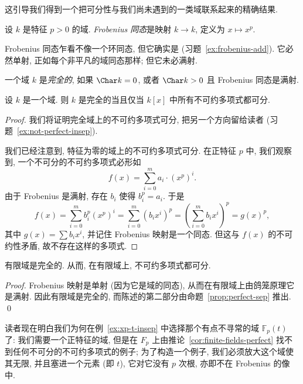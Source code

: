 这引导我们得到一个把可分性与我们尚未遇到的一类域联系起来的精确结果.

\begin{definition}\label{def:frobenius}
设 $k$ 是特征 $p>0$ 的域. \emph{Frobenius 同态}是映射 $k\to k$, 定义为 $x\mapsto x^p$.
\end{definition}

Frobenius 同态乍看不像一个环同态, 但它确实是 (习题~\ref{ex:frobenius-add}). 它必然单射, 正如每个非平凡的域同态那样; 但它未必满射.

\begin{definition}\label{def:perfect}
一个域 $k$ 是\emph{完全的}, 如果 $\Char k=0$, 或者 $\Char k>0$ 且 Frobenius 同态是满射.
\end{definition}

\begin{proposition}\label{prop:perfect-sep}
设 $k$ 是一个域. 则 $k$ 是完全的当且仅当 $k[x]$ 中所有不可约多项式都可分.
\end{proposition}

\begin{proof}
我们将证明完全域上的不可约多项式可分, 把另一个方向留给读者 (习题~\ref{ex:not-perfect-insep}).

我们已经注意到, 特征为零的域上的不可约多项式可分. 在正特征 $p$ 中, 我们观察到, 一个不可分的不可约多项式必形如
\[
f(x)=\sum_{i=0}^{m}a_i\cdot(x^p)^i.
\]
由于 Frobenius 是满射, 存在 $b_i$ 使得 $b_i^p=a_i$. 于是
\[
f(x)=\sum_{i=0}^{m}b_i^p(x^p)^i=\sum_{i=0}^{m}(b_ix^i)^p=\left(\sum_{i=0}^{m}b_ix^i\right)^p=g(x)^p,
\]
其中 $g(x)=\sum b_ix^i$, 并记住 Frobenius 映射是一个同态. 但这与 $f(x)$ 的不可约性矛盾, 故不存在这样的多项式.
\end{proof}

\begin{corollary}\label{cor:finite-fields-perfect}
有限域是完全的. 从而, 在有限域上, 不可约多项式都可分.
\end{corollary}

\begin{proof}
Frobenius 映射是单射 (因为它是域的同态), 从而在有限域上由鸽笼原理它是满射. 因此有限域是完全的, 而陈述的第二部分由命题~\ref{prop:perfect-sep} 推出. \qed
\end{proof}

读者现在明白我们为何在例~\ref{ex:xp-t-insep} 中选择那个有点不寻常的域 $\mathbb{F}_p(t)$ 了: 我们需要一个正特征的域, 但是在 $F_p$ 上由推论~\ref{cor:finite-fields-perfect} 找不到任何不可分的不可约多项式的例子; 为了构造一个例子, 我们必须放大这个域使其无限, 并且塞进一个元素 (即 $t$), 它对它没有 $p$ 次根, 亦即不在 Frobenius 的像中.

